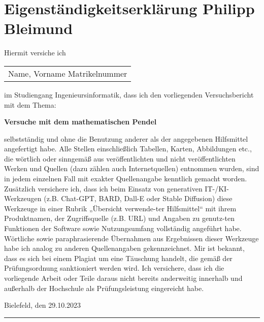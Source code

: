 \section*{Eigenständigkeitserklärung Philipp Bleimund}

Hiermit versiche ich\newline

\begin{tabular}{@{}l@{}}\hline
    Name, Vorname \hspace{8em} Matrikelnummer \hspace{2em}
\end{tabular}
\bigbreak
im Studiengang Ingenieursinformatik,\newline
dass ich den vorliegenden Versuchsbericht mit dem Thema:
\begin{center}
    \textbf{Versuche mit dem mathematischen Pendel}
\end{center}
selbstständig und ohne die Benutzung anderer als der angegebenen Hilfsmittel angefertigt habe. Alle Stellen einschließlich Tabellen, Karten, Abbildungen etc., die wörtlich oder sinngemäß aus veröffentlichten und nicht veröffentlichten Werken und Quellen (dazu zählen auch Internetquellen) entnommen wurden, sind in jedem einzelnen Fall mit exakter Quellenangabe kenntlich gemacht worden.\newline 
Zusätzlich versichere ich, dass ich beim Einsatz von generativen IT-/KI-Werkzeugen (z.B. Chat-GPT, BARD, Dall-E oder Stable Diffusion) diese Werkzeuge in einer Rubrik „Übersicht verwende-ter Hilfsmittel“ mit ihrem Produktnamen, der Zugriffsquelle (z.B. URL) und Angaben zu genutz-ten Funktionen der Software sowie Nutzungsumfang vollständig angeführt habe. Wörtliche sowie paraphrasierende Übernahmen aus Ergebnissen dieser Werkzeuge habe ich analog zu anderen Quellenangaben gekennzeichnet. Mir ist bekannt, dass es sich bei einem Plagiat um eine Täuschung handelt, die gemäß der Prüfungsordnung sanktioniert werden wird. Ich versichere, dass ich die vorliegende Arbeit oder Teile daraus nicht bereits anderweitig innerhalb und außerhalb der Hochschule als Prüfungsleistung eingereicht habe.\newline

Bielefeld, den 29.10.2023\noindent\hfill\rule{5cm}{.4pt}\par